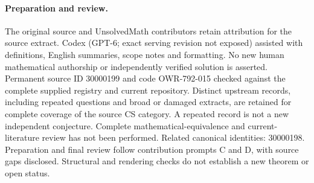\documentclass[11pt]{article}
\begin{document}
\paragraph{Preparation and review.}
The original source and UnsolvedMath contributors retain attribution for the source extract. Codex (GPT-6; exact serving revision not exposed) assisted with definitions, English summaries, scope notes and formatting. No new human mathematical authorship or independently verified solution is asserted. Permanent source ID 30000199 and code OWR-792-015 checked against the complete supplied registry and current repository. Distinct upstream records, including repeated questions and broad or damaged extracts, are retained for complete coverage of the source CS category. A repeated record is not a new independent conjecture. Complete mathematical-equivalence and current-literature review has not been performed. Related canonical identities: 30000198. Preparation and final review follow contribution prompts C and D, with source gaps disclosed. Structural and rendering checks do not establish a new theorem or open status.
\label{end:30000199}
\end{document}
